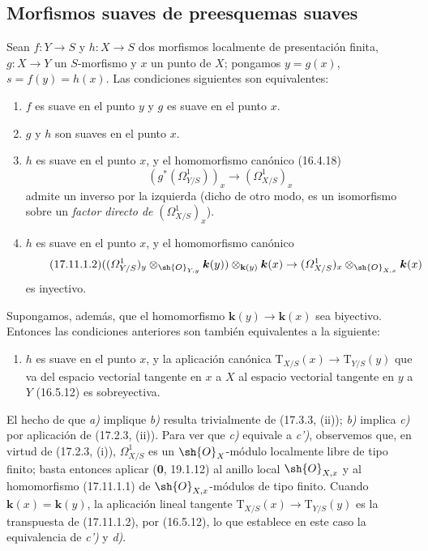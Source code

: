 \subsection{Morfismos suaves de preesquemas suaves}
\label{subsection:IV.17.11}

\begin{theorem}[17.11.1]
\label{IV.17.11.1}
Sean $f:Y\to S$ y $h:X\to S$ dos morfismos localmente de presentación finita, $g:X\to Y$ un $S$-morfismo y $x$ un punto de $X$; pongamos $y=g(x)$, $s=f(y)=h(x)$. Las condiciones siguientes son equivalentes:
\begin{enumerate}
  \item[\textup{a)}] $f$ es suave en el punto $y$ y $g$ es suave en el punto $x$.
  \item[\textup{b)}] $g$ y $h$ son suaves en el punto $x$.
  \item[\textup{c)}] $h$ es suave en el punto $x$, y el homomorfismo canónico \textup{(16.4.18)}
  \begin{equation}
  \label{IV.17.11.1.1}
  \tag{17.11.1.1}
  (g^*(\varOmega^1_{Y/S}))_x\to(\varOmega^1_{X/S})_x
  \end{equation}
  admite un inverso por la izquierda \textup{(dicho de otro modo, es un isomorfismo sobre un \emph{factor directo de} $(\varOmega^1_{X/S})_x$)}.
  \item[\textup{c$'$)}] $h$ es suave en el punto $x$, y el homomorfismo canónico
  \begin{equation}
  \label{IV.17.11.1.2}
  \tag{17.11.1.2}
  ((\varOmega^1_{Y/S})_y\otimes_{\sh{O}_{Y,y}}\boldsymbol{k}(y))\otimes_{\mathbf{k}(y)}\boldsymbol{k}(x)\to(\varOmega^1_{X/S})_x\otimes_{\sh{O}_{X,x}}\boldsymbol{k}(x)
  \end{equation}
  es inyectivo.
\end{enumerate}
Supongamos, además, que el homomorfismo $\boldsymbol{k}(y)\to\boldsymbol{k}(x)$ sea biyectivo. Entonces las condiciones anteriores son también equivalentes a la siguiente:

\begin{enumerate}
  \item[\textup{d)}] $h$ es suave en el punto $x$, y la aplicación canónica $\mathrm{T}_{X/S}(x)\to\mathrm{T}_{Y/S}(y)$ que va del espacio vectorial tangente en $x$ a $X$ al espacio vectorial tangente en $y$ a $Y$ \textup{(16.5.12)} es sobreyectiva.
\end{enumerate}
\end{theorem}

El hecho de que \emph{a)} implique \emph{b)} resulta trivialmente de (17.3.3, (ii)); \emph{b)} implica \emph{c)} por aplicación de (17.2.3, (ii)). Para ver que \emph{c)} equivale a \emph{c')}, observemos que, en virtud de (17.2.3, (i)), $\varOmega^1_{X/S}$ es un $\sh{O}_X$-módulo localmente libre de tipo finito; basta entonces aplicar (\textbf 0, 19.1.12) al anillo local $\sh{O}_{X,x}$ y al homomorfismo (17.11.1.1) de $\sh{O}_{X,x}$-módulos de tipo finito. Cuando $\boldsymbol{k}(x)=\boldsymbol{k}(y)$, la aplicación lineal tangente $\mathrm{T}_{X/S}(x)\to\mathrm{T}_{Y/S}(y)$ es la transpuesta de (17.11.1.2), por (16.5.12), lo que establece en este caso la equivalencia de \emph{c')} y \emph{d)}.



